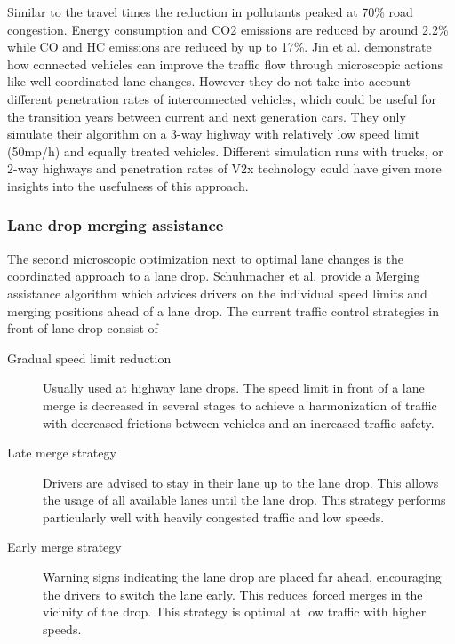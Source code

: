 \documentclass{sig-alternate}
\begin{document}
Similar to the travel times the reduction in pollutants peaked at 70\% road congestion. Energy consumption and CO2 emissions are reduced by around 2.2\% while CO and HC emissions are reduced by up to 17\%. Jin et al. demonstrate how connected vehicles can improve the traffic flow through microscopic actions like well coordinated lane changes. However they do not take into account different penetration rates of interconnected vehicles, which could be useful for the transition years between current and next generation cars. They only simulate their algorithm on a 3-way highway with relatively low speed limit (50mp/h) and equally treated vehicles. Different simulation runs with trucks, or 2-way highways and penetration rates of V2x technology could have given more insights into the usefulness of this approach. 
\subsubsection{Lane drop merging assistance}
The second microscopic optimization next to optimal lane changes is the coordinated approach to a lane drop. Schuhmacher et al.\cite{1614269.1614274} provide a Merging assistance algorithm which advices drivers on the individual speed limits and merging positions ahead of a lane drop. The current traffic control strategies in front of lane drop consist of
\begin{description}
\item[Gradual speed limit reduction] Usually used at highway lane drops. The speed limit in front of a lane merge is decreased in several stages to achieve a harmonization of traffic with decreased frictions between vehicles and an increased traffic safety.
\item[Late merge strategy] Drivers are advised to stay in their lane up to the lane drop. This allows the usage of all available lanes until the lane drop. This strategy performs particularly well with heavily congested traffic and low speeds. 
\item [Early merge strategy] Warning signs indicating the lane drop are placed far ahead, encouraging the drivers to switch the lane early. This reduces forced merges in the vicinity of the drop. This strategy is optimal at low traffic with higher speeds.  
\end{description} 







\end{document}
